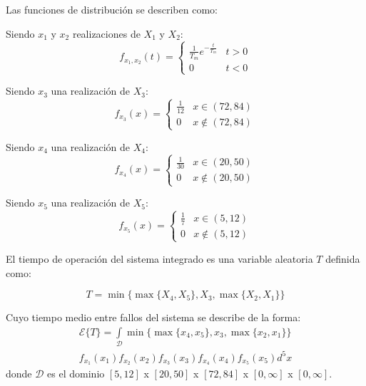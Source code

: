 \documentclass{sig-alternate}
\begin{document}
Las funciones de distribuci\'on se describen como:

Siendo $x_1$ y $x_2$ realizaciones de $X_1$ y $X_2$:
\begin{equation}
	f_{x_1, x_2}(t) = 
		\begin{cases}
		  \frac{1}{T_m} e^{-\frac{t}{T_m}} & t > 0 \\
		  0 & t < 0
		\end{cases}
\end{equation}

Siendo $x_3$ una realizaci\'on de $X_3$:
\begin{equation}
	f_{x_3}(x) = 
		\begin{cases}
		  \frac{1}{12} & x \in (72,84) \\
		  0 & x \notin (72,84)
		\end{cases}
\end{equation}

Siendo $x_4$ una realizaci\'on de $X_4$:
\begin{equation}
	f_{x_4}(x) = 
		\begin{cases}
		  \frac{1}{30} & x \in (20,50) \\
		  0 & x \notin (20,50)
		\end{cases}
\end{equation}

Siendo $x_5$ una realizaci\'on de $X_5$:
\begin{equation}
	f_{x_5}(x) = 
		\begin{cases}
		  \frac{1}{7} & x \in (5,12) \\
		  0 & x \notin (5,12)
		\end{cases}
\end{equation}

El tiempo de operaci\'on del sistema integrado es una variable 
aleatoria $T$ definida como:

\begin{equation}
 T = \min\{ \max \{ X_4, X_5 \} , X_3 , \max \{X_2, X_1\}\}
\end{equation}

Cuyo tiempo medio entre fallos del sistema se describe de la forma:
\begin{eqnarray}
\label{integralsintrans}
	\mathcal{E} \{ T \} = \int\limits_{\mathcal{D}} \min\{ \max \{ x_4, x_5 \} , x_3 , \max \{x_2, x_1\}\}
	\nonumber
	\\
	f_{x_1}(x_1) f_{x_2}(x_2) f_{x_3}(x_3) f_{x_4}(x_4) f_{x_5}(x_5) d^5x
\end{eqnarray}
donde $\mathcal{D}$ es el dominio $[5,12]$ x $[20,50]$ x $[72,84]$ x $[0,\infty]$ x $[0,\infty]$.
\end{document}
